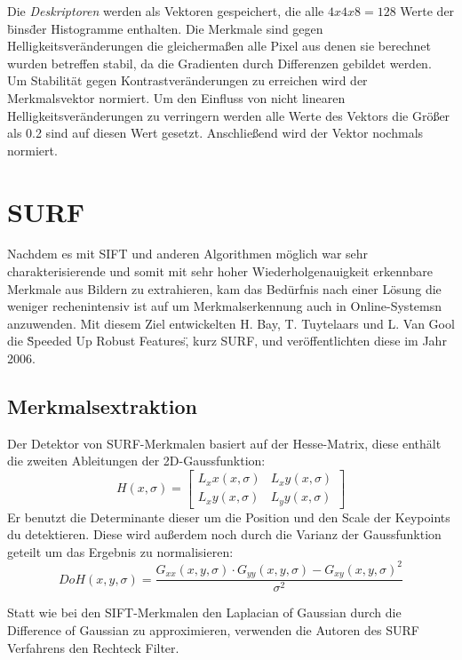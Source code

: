 Die \emph{Deskriptoren} werden als Vektoren gespeichert, die alle $4x4x8=128$ Werte der \"bins\" der Histogramme enthalten. 
Die Merkmale sind gegen Helligkeitsveränderungen die gleichermaßen alle Pixel aus denen sie berechnet wurden betreffen stabil, da die Gradienten durch Differenzen gebildet werden.
Um Stabilität gegen Kontrastveränderungen zu erreichen wird der Merkmalsvektor normiert.
Um den Einfluss von nicht linearen Helligkeitsveränderungen zu verringern werden alle Werte des Vektors die Größer als 0.2 sind auf diesen Wert gesetzt. Anschließend wird der Vektor nochmals normiert.


\section{SURF}

Nachdem es mit SIFT und anderen Algorithmen möglich war sehr charakterisierende und somit mit sehr hoher Wiederholgenauigkeit erkennbare Merkmale aus Bildern zu extrahieren, kam das Bedürfnis nach einer Lösung die weniger rechenintensiv ist auf um Merkmalserkennung auch in \Glspl{Online-System}n anzuwenden.
Mit diesem Ziel entwickelten H. Bay, T. Tuytelaars und L. Van Gool die \"Speeded Up Robust Features\", kurz SURF, und veröffentlichten diese im Jahr 2006.

\subsection{Merkmalsextraktion}

Der Detektor von SURF-Merkmalen basiert auf der Hesse-Matrix, diese enthält die zweiten Ableitungen der 2D-Gaussfunktion:
\begin{equation}
H(x, \sigma) =
\begin{bmatrix}
L_xx (x, \sigma) & L_xy (x, \sigma) \\
L_xy (x, \sigma) & L_yy (x, \sigma)
\end{bmatrix}
\end{equation}
Er benutzt die Determinante dieser um die Position und den Scale der Keypoints du detektieren.
Diese wird außerdem noch durch die Varianz der Gaussfunktion geteilt um das Ergebnis zu normalisieren:
\begin{equation}
DoH(x, y, \sigma)=\dfrac{G_{xx}(x, y, \sigma)\cdot G_{yy}(x, y, \sigma)-G_{xy}(x, y, \sigma)^{2}}{\sigma^{2}}
\end{equation}

Statt wie bei den SIFT-Merkmalen den Laplacian of Gaussian durch die Difference of Gaussian zu approximieren, verwenden die Autoren des SURF Verfahrens den Rechteck Filter.

